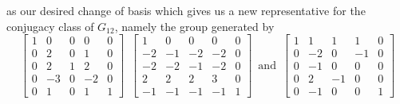 \documentclass{article}
\theoremstyle{plain}
\theoremstyle{definition}
\newcommand{\tand}{\ensuremath{\,\,\, \text{and} \,\,\,}}
\begin{document}
as our desired change of basis which gives us a new representative for the conjugacy class of $G_{12}$, namely the group generated by
$$
\left[ \begin {array}{cccc|c} 1&0&0&0&0\\  0&2&0&1&0
\\  0&2&1&2&0\\  0&-3&0&-2&0
\\ \hline 0&1&0&1&1\end {array} \right] 
\,\,\,
 \left[ \begin {array}{cccc|c} 1&0&0&0&0\\  -2&-1&-2&-
2&0\\  -2&-2&-1&-2&0\\  2&2&2&3&0
\\ \hline -1&-1&-1&-1&1\end {array} \right] 
\tand
 \left[ \begin {array}{cccc|c} 1&1&1&1&0\\  0&-2&0&-1&0
\\  0&-1&0&0&0\\  0&2&-1&0&0
\\ \hline 0&-1&0&0&1\end {array} \right]
$$
\end{document}
